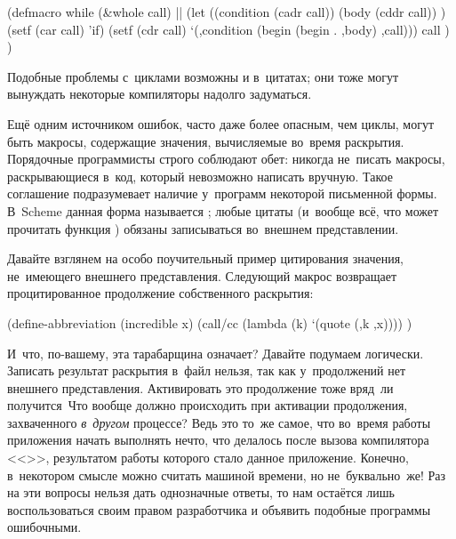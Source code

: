 \begin{code:lisp}         
(defmacro while (&whole call)    |\dialect{\CommonLisp}|
  (let ((condition (cadr call))
        (body      (cddr call)) )
    (setf (car call) 'if)
    (setf (cdr call) `(,condition (begin (begin . ,body) ,call)))
    call ) )
\end{code:lisp}

Подобные проблемы с~циклами возможны и в~цитатах; они тоже могут вынуждать
некоторые компиляторы надолго задуматься. 

Ещё одним источником ошибок, часто даже более опасным, чем циклы, могут быть
макросы, содержащие значения, вычисляемые во~время раскрытия. Порядочные
программисты строго соблюдают обет: никогда не~писать макросы, раскрывающиеся
в~код, который невозможно написать вручную. Такое соглашение подразумевает
наличие у~программ некоторой письменной формы. В~Scheme данная форма называется
; любые цитаты (и~вообще всё, что может прочитать
функция ) обязаны записываться во~внешнем представлении.

Давайте взглянем на особо поучительный пример цитирования значения, не~имеющего
внешнего представления. Следующий макрос возвращает процитированное продолжение
собственного раскрытия:

\begin{code:lisp}
(define-abbreviation (incredible x)
  (call/cc (lambda (k) `(quote (,k ,x)))) )
\end{code:lisp}

И~что, по-вашему, эта тарабарщина означает? Давайте подумаем логически. Записать
результат раскрытия в~файл нельзя, так как у~продолжений нет внешнего
представления. Активировать это продолжение тоже вряд~ли получится\textdots\
Что вообще должно происходить при активации продолжения, захваченного
\emph{в~другом} процессе? Ведь это то~же самое, что во~время работы приложения
\ic{a.out} начать выполнять нечто, что делалось после вызова компилятора
<<\ic{cc~main.c}>>, результатом работы которого стало данное приложение.
Конечно, в~некотором смысле \ic{call/cc} можно считать машиной времени, но
не~буквально~же! Раз на эти вопросы нельзя дать однозначные ответы, то нам
остаётся лишь воспользоваться своим правом разработчика и объявить подобные
программы ошибочными.

